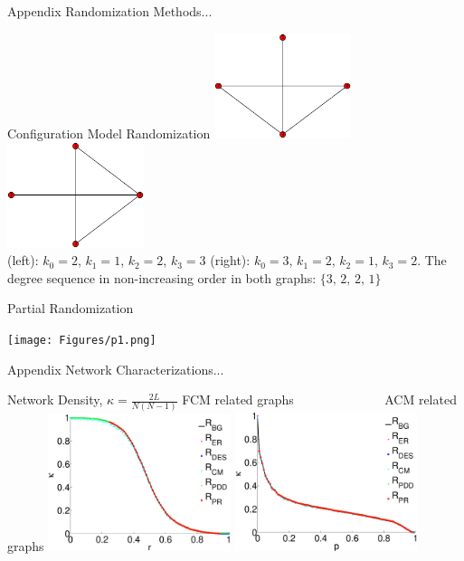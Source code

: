 \documentclass{beamer}
\begin{document}
\begin{frame}{Appendix}
Randomization Methods...

\footnotesize{Configuration Model Randomization} 
	\centering	
	\includegraphics[width=0.3\textwidth]{Figures/G_config_1.eps}  
	\includegraphics[width=0.3\textwidth]{Figures/G_config_2.eps}  \\
\tiny{(left): $k_0 = 2$, $k_1 =1$, $k_2=2$, $k_3=3$  (right): $k_0 = 3$, $k_1 =2$, $k_2=1$, $k_3=2$. The degree sequence in non-increasing order in both graphs: $\{3,\,2,\,2,\,1\}$ } 
\break

\footnotesize{Partial Randomization}

\texttt{[image: Figures/p1.png]}  

\end{frame}



\begin{frame}{Appendix}
Network Characterizations...

{Network Density, $\kappa=\frac{2L}{N(N-1)}$} 
\break
\break
\footnotesize{FCM related graphs ~~~~~~~~~~~~~ ACM related graphs}
	\centering	
\includegraphics[width=0.40\textwidth]{Figures/Network_Density_Fnc.eps}
\includegraphics[width=0.40\textwidth]{Figures/Network_Density_Stru.eps} 

\end{frame}
\end{document}
